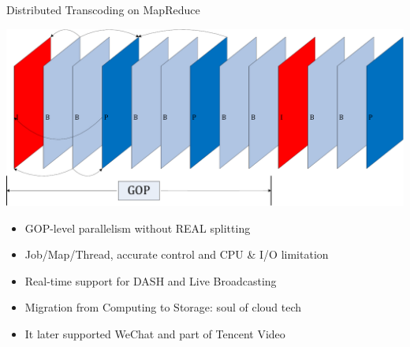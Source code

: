 \documentclass{beamer}
\begin{document}
\begin{frame}{Distributed Transcoding on MapReduce}
\begin{center}
\includegraphics[scale=0.22]{fig/GOP.pdf}
\end{center}
\begin{itemize}
\item GOP-level parallelism without REAL splitting
\item Job/Map/Thread, accurate control and CPU \& I/O limitation
\item Real-time support for DASH and Live Broadcasting
\item Migration from Computing to Storage: soul of cloud tech
\item It later supported WeChat and part of Tencent Video
\end{itemize}
\end{frame}
\end{document}
